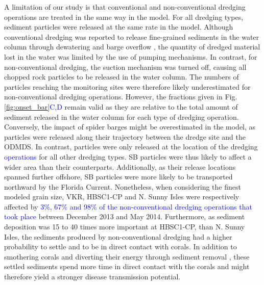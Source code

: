 \documentclass[preprint,12pt,authoryear]{elsarticle}
\newcommand{\modif}[1]{\textcolor{blue}{#1}}
\begin{document}
A limitation of our study is that conventional and non-conventional dredging operations are treated in the same way in the model. For all dredging types, sediment particles were released at the same rate in the model. Although conventional dredging was reported to release fine-grained sediments in the water column through dewatering and barge overflow \citep{jones2016assessing}, the quantity of dredged material lost in the water was limited by the use of pumping mechanisms. In contrast, for non-conventional dredging, the suction mechanism was turned off, causing all chopped rock particles to be released in the water column. The numbers of particles reaching the monitoring sites were therefore likely underestimated for non-conventional dredging operations. However, the fractions given in Fig. \ref{fig:onset_bar}\modif{C,D} remain valid as they are relative to the total amount of sediment released in the water column for each type of dredging operation. Conversely, the impact of spider barges might be overestimated in the model, as particles were released along their trajectory between the dredge site and the ODMDS. In contrast, particles were only released at the location of the dredging \modif{operations} for all other dredging types. SB particles were thus likely to affect a wider area than their counterparts. Additionally, as their release locations spanned further offshore, SB particles were more likely to be transported northward by the Florida Current. Nonetheless, when considering the finest modeled grain size, VKR, HBSC1-CP and N. Sunny Isles were respectively affected by \modif{3\%, 67\% and 98\% of the non-conventional dredging operations that took place} between December 2013 and May 2014. Furthermore, as sediment deposition was 15 to 40 times more important at HBSC1-CP, than N. Sunny Isles, the sediments produced by non-conventional dredging had a higher probability to settle and to be in direct contact with corals. In addition to smothering corals and diverting their energy through sediment removal \citep{erftemeijer2012environmental}, these settled sediments spend more time in direct contact with the corals and might therefore yield a stronger disease transmission potential.
\end{document}
